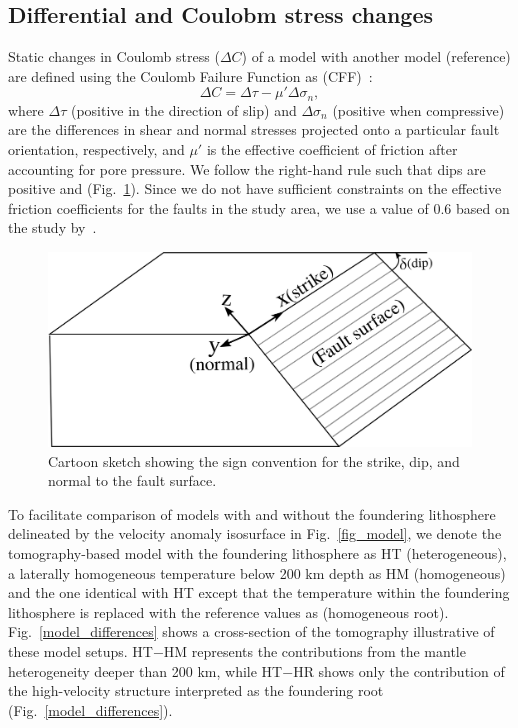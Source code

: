 \documentclass[draft,linenumbers]{agujournal2018}
\begin{document}
\subsection{Differential and Coulobm stress changes}
Static changes in Coulomb stress ($\Delta C$) of a model with another model (reference) are defined using the Coulomb Failure Function as (CFF)~\citep{king1994static}:
%
\begin{equation}
    \Delta C = \Delta \tau - \mu' \Delta \sigma_n,
\end{equation}
%
where $\Delta \tau$ (positive in the direction of slip) and $\Delta\sigma_n$ (positive when compressive) are the differences in shear and normal stresses projected onto a particular fault orientation, respectively, and $\mu'$ is the effective coefficient of friction after accounting for pore pressure. We follow the right-hand rule such that dips are positive  and  (Fig.~\ref{signs}).
Since we do not have sufficient constraints on the effective friction coefficients for the faults in the study area, we use a value of 0.6 based on the study by~\citet{hurd2012intraplate}. 
%
\begin{figure}[h!]
    \centering
    \includegraphics[width=0.5\linewidth]{figures/sign_convention.png}
    \caption{Cartoon sketch showing the sign convention for the strike, dip, and normal to the fault surface.}
    \label{signs}
\end{figure}

To facilitate comparison of models with and without the foundering lithosphere delineated by the velocity anomaly isosurface in Fig.~\ref{fig_model}, we denote the tomography-based model with the foundering lithosphere as HT (heterogeneous), a laterally homogeneous temperature below 200 km depth as HM (homogeneous) and the one identical with HT except that the temperature within the foundering lithosphere is replaced with the reference values as (homogeneous root). Fig.~\ref{model_differences} shows a cross-section of the tomography illustrative of these model setups. HT$-$HM represents the contributions from the mantle heterogeneity deeper than 200 km, while HT$-$HR shows only the contribution of the high-velocity structure interpreted as the foundering root (Fig.~\ref{model_differences}).  
\end{document}
